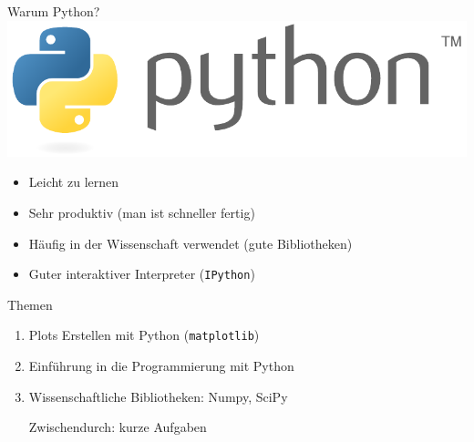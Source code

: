 
\begin{frame}{Warum Python?}
  \includegraphics[width=\textwidth]{logos/python.pdf}
  \begin{itemize}
    \item Leicht zu lernen
    \item Sehr produktiv (man ist schneller fertig)
    \item Häufig in der Wissenschaft verwendet (gute Bibliotheken)
    \item Guter interaktiver Interpreter (\texttt{IPython})
  \end{itemize}
\end{frame}

\begin{frame}{Themen}
  \linespread{2}
  \begin{enumerate}
    \item {\large Plots Erstellen mit Python (\texttt{matplotlib})}
    \item {\large Einführung in die Programmierung mit Python}
    \item {\large Wissenschaftliche Bibliotheken: Numpy, SciPy}

    \Large Zwischendurch: kurze Aufgaben
  \end{enumerate}
\end{frame}

